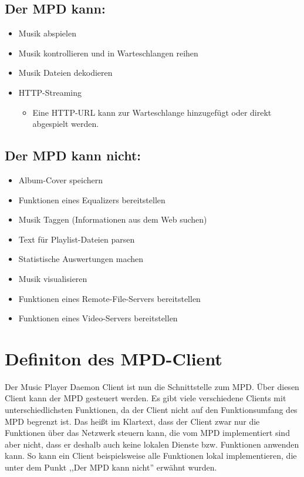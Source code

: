 \subsection{Der MPD kann:}
\renewcommand{\labelitemi}{•}
\begin{itemize}
    \item Musik abspielen
    \item Musik kontrollieren und in Warteschlangen reihen 
    \item Musik Dateien dekodieren
    \item HTTP-Streaming
        \renewcommand{\labelitemi}{--}
        \begin{itemize}
            \item Eine HTTP-URL kann zur Warteschlange hinzugefügt oder direkt abgespielt werden.\\
        \end{itemize}
\end{itemize}

\subsection{Der MPD kann nicht:}
\begin{itemize}
    \item Album-Cover speichern
    \item Funktionen eines Equalizers bereitstellen
    \item Musik Taggen (Informationen aus dem Web suchen)
    \item Text für Playlist-Dateien parsen
    \item Statistische Auswertungen machen
    \item Musik visualisieren
    \item Funktionen eines Remote-File-Servers bereitstellen
    \item Funktionen eines Video-Servers bereitstellen
\end{itemize}
\section{Definiton des MPD-Client}
Der Music Player Daemon Client ist nun die Schnittstelle zum MPD. Über diesen Client kann der MPD
gesteuert werden. Es gibt viele verschiedene Clients mit unterschiedlichsten Funktionen, da der 
Client nicht auf den Funktionsumfang des MPD begrenzt ist. Das heißt im Klartext, dass der Client
zwar nur die Funktionen über das Netzwerk steuern kann, die vom MPD implementiert sind aber nicht, 
dass er deshalb auch keine lokalen Dienste bzw. Funktionen anwenden kann. So kann ein Client 
beispielsweise alle Funktionen lokal implementieren, die unter dem Punkt ,,Der MPD kann nicht''
erwähnt wurden.

